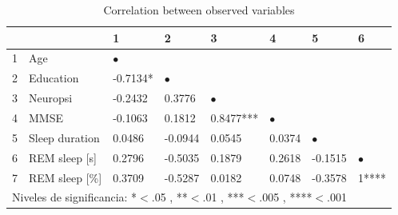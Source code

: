 \documentclass[10pt]{article}
\newcommand{\phm}{\phantom{-}}
\begin{document}
\begin{table}
\centering
\caption{Correlation between observed variables}
\begin{tabular}{llllllll}
\toprule
  &             & 1 & 2 & 3 & 4 & 5 & 6 \\
\midrule
1 & Age        & $\bullet$  &          &           &          &          & \\
2 & Education  & -0.7134* &  $\bullet$ &           &          &          & \\
3 & Neuropsi   & -0.2432  & \phm 0.3776  & $\bullet$   &          &          & \\
4 & MMSE       & -0.1063  & \phm 0.1812  & 0.8477*** & $\bullet$  &          & \\
5 & Sleep duration & \phm  0.0486  & -0.0944  & 0.0545    & 0.0374   & $\bullet$  & \\
6 & REM sleep [s]     & \phm 0.2796  & -0.5035  & 0.1879    & 0.2618   & -0.1515  & $\bullet$ \\
7 & REM sleep [\%]    & \phm 0.3709  & -0.5287  & 0.0182    & 0.0748   & -0.3578  & 1**** \\
\bottomrule
\multicolumn{7}{l}{Niveles de significancia: *$<$.05 , **$<$.01 , ***$<$.005 , ****$<$.001}
\end{tabular}
\label{cor_ind}
\end{table}

\setlength\tabcolsep{3pt}
\end{document}
